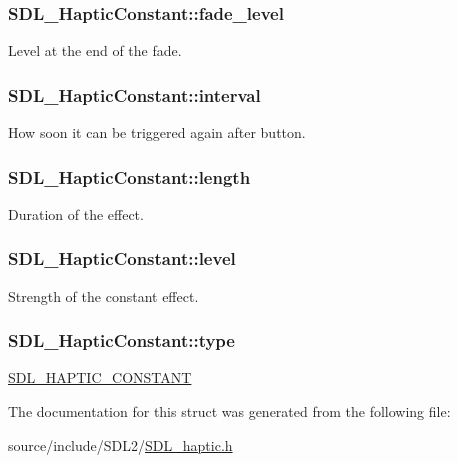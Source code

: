 \subsubsection[{fade\+\_\+level}]{ S\+D\+L\+\_\+\+Haptic\+Constant\+::fade\+\_\+level}\label{struct_s_d_l___haptic_constant_a49f6499c89f3e494efbe92f12277c949}
Level at the end of the fade. \hypertarget{struct_s_d_l___haptic_constant_ab1f7f0df856f4cf1fdf937cb886226b4}{}
\subsubsection[{interval}]{ S\+D\+L\+\_\+\+Haptic\+Constant\+::interval}\label{struct_s_d_l___haptic_constant_ab1f7f0df856f4cf1fdf937cb886226b4}
How soon it can be triggered again after button. \hypertarget{struct_s_d_l___haptic_constant_aeb994c356b1d236b060f277d157e98ec}{}
\subsubsection[{length}]{ S\+D\+L\+\_\+\+Haptic\+Constant\+::length}\label{struct_s_d_l___haptic_constant_aeb994c356b1d236b060f277d157e98ec}
Duration of the effect. \hypertarget{struct_s_d_l___haptic_constant_a5b095eea77464623ed57af15f29f4ca6}{}
\subsubsection[{level}]{ S\+D\+L\+\_\+\+Haptic\+Constant\+::level}\label{struct_s_d_l___haptic_constant_a5b095eea77464623ed57af15f29f4ca6}
Strength of the constant effect. \hypertarget{struct_s_d_l___haptic_constant_a5cb31202803a8bc1be95fcede5ac8afb}{}
\subsubsection[{type}]{ S\+D\+L\+\_\+\+Haptic\+Constant\+::type}\label{struct_s_d_l___haptic_constant_a5cb31202803a8bc1be95fcede5ac8afb}
\hyperlink{_s_d_l__haptic_8h_a955fb9f680dcf9cc72a3d5263e85b80a}{S\+D\+L\+\_\+\+H\+A\+P\+T\+I\+C\+\_\+\+C\+O\+N\+S\+T\+A\+N\+T} 

The documentation for this struct was generated from the following file\+:\begin{DoxyCompactItemize}
\item 
source/include/\+S\+D\+L2/\hyperlink{_s_d_l__haptic_8h}{S\+D\+L\+\_\+haptic.\+h}\end{DoxyCompactItemize}

